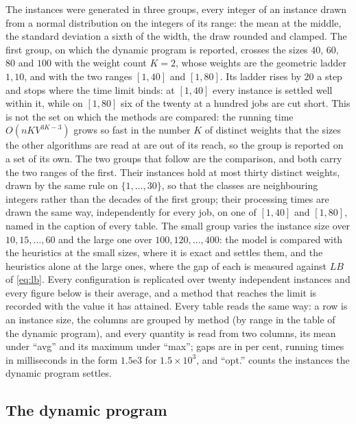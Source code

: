 \documentclass[12pt]{article}
\begin{document}
\begin{sloppypar}
        The instances were generated in three groups, every integer of an instance drawn from a normal
        distribution on the integers of its range: the mean at the middle, the standard deviation a sixth
        of the width, the draw rounded and clamped. The first group, on which the dynamic program is
        reported, crosses the sizes $40$, $60$, $80$ and $100$ with the weight count $K=2$, whose weights
        are the geometric ladder $1,10$, and with the two ranges $[1,40]$ and $[1,80]$. Its ladder rises
        by $20$ a step and stops where the time limit binds: at $[1,40]$ every instance is settled well
        within it, while on $[1,80]$ six of the twenty at a hundred jobs are cut short. This is not the
        set on which the methods are compared: the running time $O(nKV^{3K-3})$ grows so fast in the
        number $K$ of distinct weights that the sizes the other algorithms are read at are out of its
        reach, so the group is reported on a set of its own. The two groups that follow are the
        comparison, and both carry the two ranges of the first. Their instances hold at most thirty
        distinct weights, drawn by the same rule on $\{1,\dots,30\}$, so that the classes are neighbouring
        integers rather than the decades of the first group; their processing times are drawn the same
        way, independently for every job, on one of $[1,40]$ and $[1,80]$, named in the caption of every
        table. The small group varies the instance size over $10,15,\dots,60$ and the large one over
        $100,120,\dots,400$: the model is compared with the heuristics at the small sizes, where it is
        exact and settles them, and the heuristics alone at the large ones, where the gap of each is
        measured against $LB$ of \cref{eq:lb}. Every configuration is replicated over twenty independent
        instances and every figure below is their average, and a method that reaches the limit is
        recorded with the value it has attained. Every table reads the same way: a row is an instance
        size, the columns are grouped by method (by range in the table of the dynamic program), and every
        quantity is read from two columns, its mean under ``avg'' and its maximum under ``max''; gaps are
        in per cent, running times in milliseconds in the form $1.5\mathrm{e}3$ for $1.5\times10^{3}$, and
        ``opt.'' counts the instances the dynamic program settles.
        
        \subsection{The dynamic program}
        

\end{sloppypar}
\end{document}
